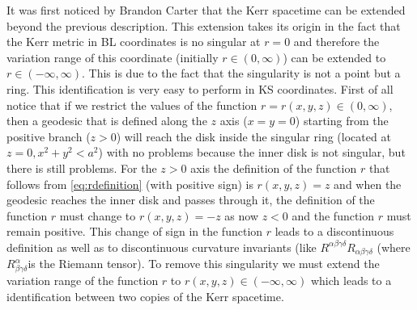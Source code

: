 It was first noticed by Brandon Carter \cite{carter1968global} that the Kerr spacetime can be extended beyond the previous description. This extension takes its origin in the fact that the Kerr metric in \gls{BL} coordinates is no singular at $r=0$ and therefore the variation range of this coordinate (initially $r\in(0,\infty)$) can be extended to $r\in(-\infty,\infty)$. This is due to the fact that the singularity is not a point but a ring. This identification is very easy to perform in \gls{KS} coordinates. First of all notice that if we restrict the values of the function $r=r(x,y,z)\in(0,\infty)$, then a geodesic that is defined along the $z$ axis ($x=y=0$) starting from the positive branch ($z>0$) will reach the disk inside the singular ring (located at $z=0,x^2+y^2<a^2$) with no problems because the inner disk is not singular, but there is still problems. For the $z>0$ axis the definition of the function $r$ that follows from \cref{eq:rdefinition} (with positive sign) is $r(x,y,z)=z$ and when the geodesic reaches the inner disk and passes through it, the definition of the function $r$ must change to $r(x,y,z)=-z$ as now $z<0$ and the function $r$ must remain positive. This change of sign in the function $r$ leads to a discontinuous definition as well as  to discontinuous curvature invariants  (like $R^{\alpha \beta \gamma \delta} R_{\alpha \beta \gamma \delta}$ (where $R^{\alpha}_{\beta \gamma \delta}$is the Riemann tensor). To remove this singularity we must extend the variation range of the function $r$ to $r(x,y,z)\in(-\infty,\infty)$ which leads to a identification between two copies of the Kerr spacetime.

